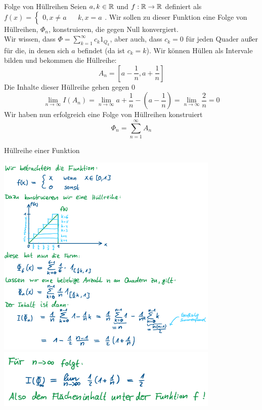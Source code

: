 \begin{Beispiel}{Folge von Hüllreihen}
Seien $a, k\in \mathbb{R}$ und $f:\mathbb{R}\rightarrow\mathbb{R}$ definiert als $f(x)=\begin{cases}0, x\neq a && k, x=a\end{cases}$. Wir sollen zu dieser Funktion eine Folge von Hüllreihen, $\Phi_n$, konstruieren, die gegen Null konvergiert. \\
Wir wissen, dass $\Phi = \sum_{k=1}^\infty c_k 1_{Q_k}$, aber auch, dass $c_k=0$ für jeden Quader außer für die, in denen sich $a$ befindet (da ist $c_k=k$). Wir können Hüllen als Intervale bilden und bekommen die Hüllreihe:
$$A_n=[a-\frac{1}{n}, a+\frac{1}{n}]$$
Die Inhalte dieser Hüllreihe gehen gegen 0
$$\lim_{n\rightarrow\infty}I(A_n)=\lim_{n\rightarrow\infty} a+\frac{1}{n}-(a-\frac{1}{n})=\lim_{n\rightarrow\infty}\frac{2}{n}=0$$
Wir haben nun erfolgreich eine Folge von Hüllreihen konstruiert
$$\Phi_n=\sum_{n=1}^\infty A_n$$
\end{Beispiel}
\begin{Beispiel}{Hüllreihe einer Funktion}
            \begin{center}
    \includegraphics[width=0.80\textwidth]{Dateien/Robin_Hullreihen1.png}
    \includegraphics[width=0.80\textwidth]{Dateien/Robin_Hullreihen2.png}
\end{center}
\end{Beispiel}
